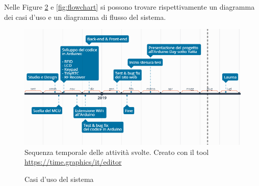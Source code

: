 \documentclass[12pt]{report}
\begin{document}
Nelle Figure \ref{fig:usecase} e \ref{fig:flowchart} si possono trovare rispettivamente un diagramma dei casi d'uso e un diagramma di flusso del sistema.

\begin{figure}[H]
	\includegraphics[width=\linewidth]{./img/timeline.png}
	\caption{Sequenza temporale delle attività svolte. Creato con il tool \url{https://time.graphics/it/editor}}
	\label{fig:timeline}
\end{figure}

\begin{figure}[H]
	\caption{Casi d'uso del sistema}
	\label{fig:usecase}
\end{figure}

\vspace*{75px} 
\end{document}

